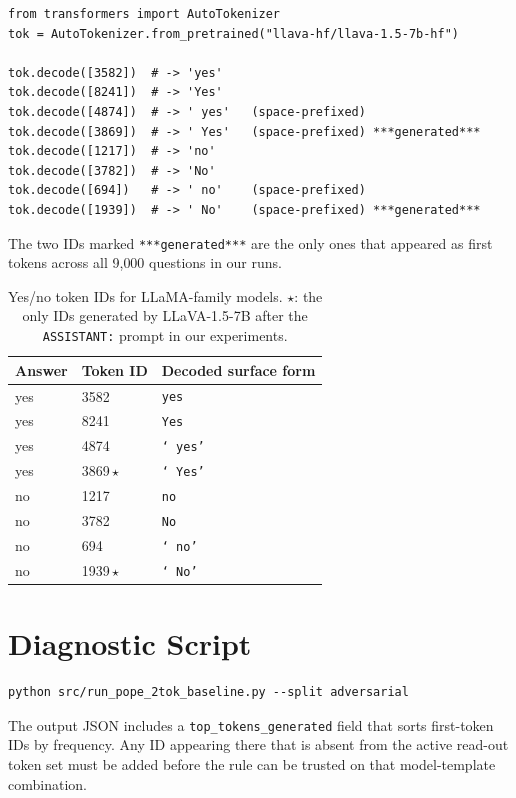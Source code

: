\documentclass{article}
\begin{document}
\begin{lstlisting}
from transformers import AutoTokenizer
tok = AutoTokenizer.from_pretrained("llava-hf/llava-1.5-7b-hf")

tok.decode([3582])  # -> 'yes'
tok.decode([8241])  # -> 'Yes'
tok.decode([4874])  # -> ' yes'   (space-prefixed)
tok.decode([3869])  # -> ' Yes'   (space-prefixed) ***generated***
tok.decode([1217])  # -> 'no'
tok.decode([3782])  # -> 'No'
tok.decode([694])   # -> ' no'    (space-prefixed)
tok.decode([1939])  # -> ' No'    (space-prefixed) ***generated***
\end{lstlisting}

The two IDs marked \texttt{***generated***} are the only ones that
appeared as first tokens across all 9{,}000 questions in our runs.

\begin{table}[h]
\caption{Yes/no token IDs for LLaMA-family models. $\star$: the only
IDs generated by LLaVA-1.5-7B after the \texttt{ASSISTANT:} prompt in
our experiments.}
\label{tab:tokenids}
\centering
\begin{tabular}{lll}
\toprule
Answer & Token ID & Decoded surface form \\
\midrule
yes & 3582 & \texttt{yes} \\
yes & 8241 & \texttt{Yes} \\
yes & 4874 & \texttt{`\,yes'} \\
yes & 3869\,$\star$ & \texttt{`\,Yes'} \\
\midrule
no  & 1217 & \texttt{no} \\
no  & 3782 & \texttt{No} \\
no  &  694 & \texttt{`\,no'} \\
no  & 1939\,$\star$ & \texttt{`\,No'} \\
\bottomrule
\end{tabular}
\end{table}

\section{Diagnostic Script}
\label{app:diagnostic}

\begin{verbatim}
python src/run_pope_2tok_baseline.py --split adversarial
\end{verbatim}
The output JSON includes a \texttt{top\_tokens\_generated} field that
sorts first-token IDs by frequency. Any ID appearing there that is
absent from the active read-out token set must be added before the rule
can be trusted on that model-template combination.
\end{document}

